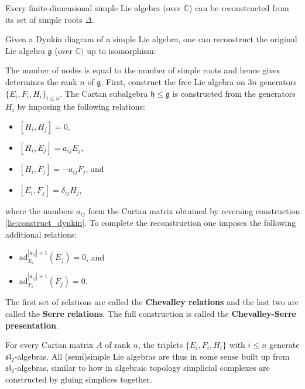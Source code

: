     \begin{theorem}
        Every finite-dimensional simple Lie algebra (over $\mathbb{C}$) can be reconstructed from its set of simple roots $\Delta$.
    \end{theorem}
    \begin{construct}\label{lie:reconstruction}
        Given a Dynkin diagram of a simple Lie algebra, one can reconstruct the original Lie algebra $\mathfrak{g}$ (over $\mathbb{C})$ up to isomorphism:

        \qquad The number of nodes is equal to the number of simple roots and hence gives determines the rank $n$ of $\mathfrak{g}$. First, construct the free Lie algebra on $3n$ generators $\{E_i,F_i,H_i\}_{i\leq n}$. The Cartan subalgebra $\mathfrak{h}\leq\mathfrak{g}$ is constructed from the generators $H_i$ by imposing the following relations:
        \begin{itemize}
            \item $[H_i,H_j] = 0$,
            \item $[H_i,E_j] = a_{ij}E_j$,
            \item $[H_i,F_j] = -a_{ij}F_j$, and
            \item $[E_i,F_j] = \delta_{ij}H_j$,
        \end{itemize}
        where the numbers $a_{ij}$ form the Cartan matrix obtained by reversing construction \ref{lie:construct_dynkin}. To complete the reconstruction one imposes the following additional relations:
        \begin{itemize}
            \item $\text{ad}_{E_i}^{|a_{ij}|+1}(E_j) = 0$, and
            \item $\text{ad}_{F_i}^{|a_{ij}|+1}(F_j) = 0$.
        \end{itemize}
        The first set of relations are called the \textbf{Chevalley relations} and the last two are called the \textbf{Serre relations}. The full construction is called the \textbf{Chevalley-Serre presentation}.
    \end{construct}

    \begin{property}[$\mathfrak{sl}_2$]
        For every Cartan matrix $A$ of rank $n$, the triplets $\{E_i,F_i,H_i\}$ with $i\leq n$ generate $\mathfrak{sl}_2$-algebras. All (semi)simple Lie algebras are thus in some sense built up from $\mathfrak{sl}_2$-algebras, similar to how in algebraic topology simplicial complexes are constructed by gluing simplices together.
    \end{property}

